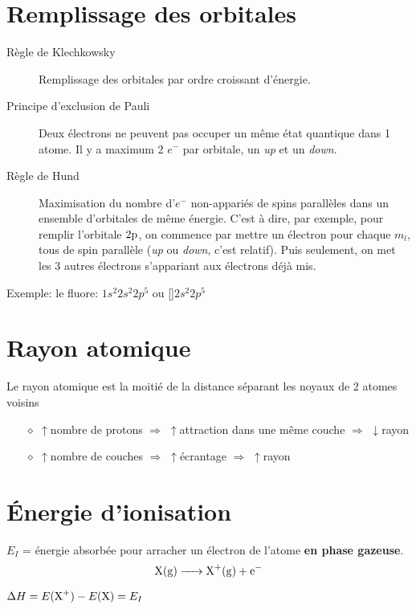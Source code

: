 \section{Remplissage des orbitales}
\begin{description}
  \item[Règle de Klechkowsky]
    Remplissage des orbitales par ordre croissant d'énergie.
  \item[Principe d'exclusion de Pauli]
    Deux électrons ne peuvent pas occuper un même état quantique dans 1 atome.
    Il y a maximum 2 $e^-$ par orbitale, un {\em up} et un {\em down}.
  \item[Règle de Hund]
    Maximisation du nombre d'$e^-$ non-appariés de spins parallèles dans un ensemble d'orbitales de même énergie.
    C'est à dire, par exemple, pour remplir l'orbitale $2\mathrm{p}$,
    on commence par mettre un électron pour chaque $m_l$, tous de spin parallèle
    ({\em up} ou {\em down}, c'est relatif).
    Puis seulement, on met les 3 autres électrons s'appariant aux électrons déjà mis.
\end{description}

Exemple: le fluore:  $1s^2 2s^2 2p^5$ ou []$2s^2 2p^5$


\section{Rayon atomique}
Le rayon atomique est la moitié de la distance séparant les noyaux de 2 atomes voisins
\begin{itemize}
  \item[$\diamond$]$\uparrow$nombre de protons $\Rightarrow$ $\uparrow$attraction dans une même couche $\Rightarrow$  $\downarrow$rayon
  \item[$\diamond$]$\uparrow$nombre de couches $\Rightarrow$ $\uparrow$écrantage $\Rightarrow$ $\uparrow$rayon
\end{itemize}

\section{\'Energie d'ionisation}
\label{sec:ioni}

$E_I$ = énergie absorbée pour arracher un électron de l'atome \textbf{en phase gazeuse}.
$$\ce{X(g) -> X+(g) + e-}$$

$\Delta H = E(\ce{X^+})-E(\ce{X}) = E_I$

